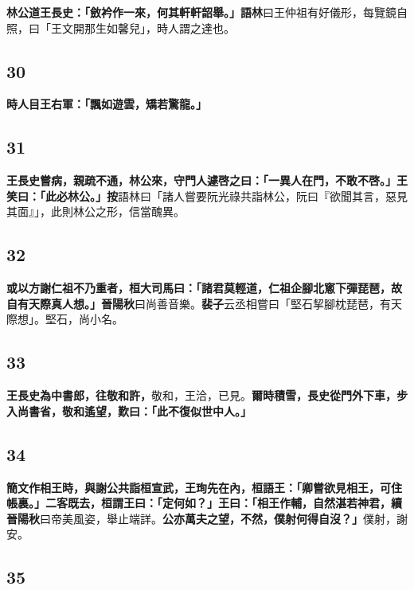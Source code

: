 \textbf{林公道王長史：「斂衿作一來，何其軒軒韶舉。」}{\footnotesize \textbf{語林}曰王仲祖有好儀形，每覽鏡自照，曰「王文開那生如馨兒」，時人謂之達也。}

\subsection*{30}

\textbf{時人目王右軍：「飄如遊雲，矯若驚龍。」}

\subsection*{31}

\textbf{王長史嘗病，親疏不通，林公來，守門人遽啓之曰：「一異人在門，不敢不啓。」王笑曰：「此必林公。」}{\footnotesize \textbf{按}語林曰「諸人嘗要阮光祿共詣林公，阮曰『欲聞其言，惡見其面』」，此則林公之形，信當醜異。}

\subsection*{32}

\textbf{或以方謝仁祖不乃重者，桓大司馬曰：「諸君莫輕道，仁祖企腳北窻下彈琵琶，故自有天際真人想。」}{\footnotesize \textbf{晉陽秋}曰尚善音樂。\textbf{裴子}云丞相嘗曰「堅石挈腳枕琵琶，有天際想」。堅石，尚小名。}

\subsection*{33}

\textbf{王長史為中書郎，往敬和許，}{\footnotesize 敬和，王洽，已見。}\textbf{爾時積雪，長史從門外下車，步入尚書省，敬和遙望，歎曰：「此不復似世中人。」}

\subsection*{34}

\textbf{簡文作相王時，與謝公共詣桓宣武，王珣先在內，桓語王：「卿嘗欲見相王，可住帳裏。」二客既去，桓謂王曰：「定何如？」王曰：「相王作輔，自然湛若神君，}{\footnotesize \textbf{續晉陽秋}曰帝美風姿，舉止端詳。}\textbf{公亦萬夫之望，不然，僕射何得自沒？」}{\footnotesize 僕射，謝安。}

\subsection*{35}

